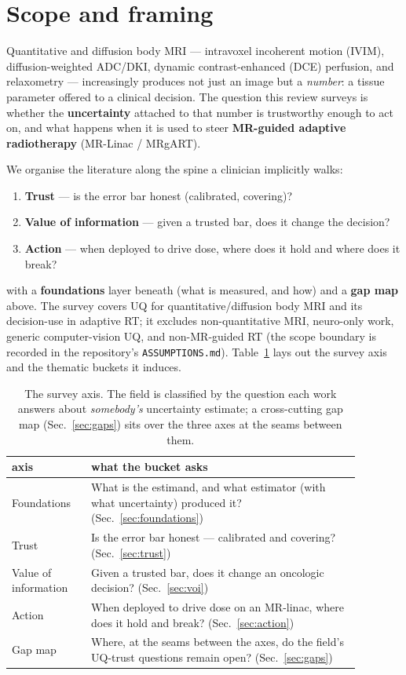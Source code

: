 \documentclass[review,number]{elsarticle}
\begin{document}
\section{Scope and framing}
\label{sec:scope}

Quantitative and diffusion body MRI --- intravoxel incoherent motion (IVIM),
diffusion-weighted ADC/DKI, dynamic contrast-enhanced (DCE) perfusion, and relaxometry
--- increasingly produces not just an image but a \emph{number}: a tissue parameter
offered to a clinical decision. The question this review surveys is whether the
\textbf{uncertainty} attached to that number is trustworthy enough to act on, and what
happens when it is used to steer \textbf{MR-guided adaptive radiotherapy} (MR-Linac /
MRgART).

We organise the literature along the spine a clinician implicitly walks:

\begin{enumerate}
  \item \textbf{Trust} --- is the error bar honest (calibrated, covering)?
  \item \textbf{Value of information} --- given a trusted bar, does it change the decision?
  \item \textbf{Action} --- when deployed to drive dose, where does it hold and where does it break?
\end{enumerate}

\noindent with a \textbf{foundations} layer beneath (what is measured, and how) and a
\textbf{gap map} above. The survey covers UQ for quantitative/diffusion body MRI and its
decision-use in adaptive RT; it excludes non-quantitative MRI, neuro-only work, generic
computer-vision UQ, and non-MR-guided RT (the scope boundary is recorded in the
repository's \texttt{ASSUMPTIONS.md}). Table~\ref{tab:axis} lays out the survey axis and
the thematic buckets it induces.

\begin{table}
\caption{The survey axis. The field is classified by the question each work answers
about \emph{somebody's} uncertainty estimate; a cross-cutting gap map
(Sec.~\ref{sec:gaps}) sits over the three axes at the seams between them.}
\label{tab:axis}
\centering
\begin{tabular}{p{0.20\linewidth}p{0.68\linewidth}}
\toprule
axis & what the bucket asks \\
\midrule
Foundations & What is the estimand, and what estimator (with what uncertainty) produced it? (Sec.~\ref{sec:foundations}) \\
Trust & Is the error bar honest --- calibrated and covering? (Sec.~\ref{sec:trust}) \\
Value of information & Given a trusted bar, does it change an oncologic decision? (Sec.~\ref{sec:voi}) \\
Action & When deployed to drive dose on an MR-linac, where does it hold and break? (Sec.~\ref{sec:action}) \\
Gap map & Where, at the seams between the axes, do the field's UQ-trust questions remain open? (Sec.~\ref{sec:gaps}) \\
\bottomrule
\end{tabular}
\end{table}
\end{document}
